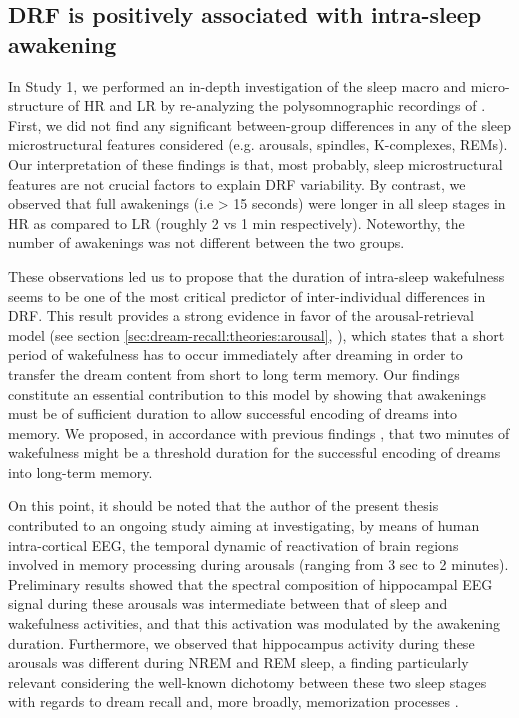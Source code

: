 \subsection{DRF is positively associated with intra-sleep awakening}
\label{disc:drf:summary:arousals}

In Study 1, we performed an in-depth investigation of the sleep macro and micro-structure of HR and LR by re-analyzing the polysomnographic recordings of \citet{eichenlaub_brain_2014}. First, we did not find any significant between-group differences in any of the sleep microstructural features considered (e.g. arousals, spindles, K-complexes, REMs). Our interpretation of these findings is that, most probably, sleep microstructural features are not crucial factors to explain DRF variability.
By contrast, we observed that full awakenings (i.e > 15 seconds) were longer in all sleep stages in HR as compared to LR (roughly 2 vs 1 min respectively). Noteworthy, the number of awakenings was not different between the two groups.

These observations led us to propose that the duration of intra-sleep wakefulness seems to be one of the most critical predictor of inter-individual differences in DRF. This result provides a strong evidence in favor of the arousal-retrieval model (see section \ref{sec:dream-recall:theories:arousal}, \citealp{koulack_dream_1976}), which states that a short period of wakefulness has to occur immediately after dreaming in order to transfer the dream content from short to long term memory. Our findings constitute an essential contribution to this model by showing that awakenings must be of sufficient duration to allow successful encoding of dreams into memory. We proposed, in accordance with previous findings \citep{campbell_perception_1981}, that two minutes of wakefulness might be a threshold duration for the successful encoding of dreams into long-term memory.

On this point, it should be noted that the author of the present thesis contributed to an ongoing study aiming at investigating, by means of human intra-cortical EEG, the temporal dynamic of reactivation of brain regions involved in memory processing during arousals (ranging from 3 sec to 2 minutes). Preliminary results showed that the spectral composition of hippocampal EEG signal during these arousals was intermediate between that of sleep and wakefulness activities, and that this activation was modulated by the awakening duration. Furthermore, we observed that hippocampus activity during these arousals was different during NREM and REM sleep, a finding particularly relevant considering the well-known dichotomy between these two sleep stages with regards to dream recall and, more broadly, memorization processes \citep{nielsen_review_2000, conduit_poor_2004}.

